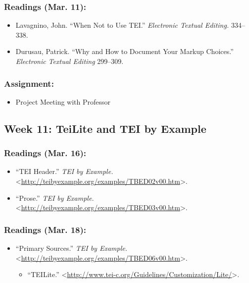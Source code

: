 \documentclass[]{article}
\begin{document}
\subsubsection{Readings (Mar. 11):}\label{readings-mar.-11}

\begin{itemize}
\itemsep1pt\parskip0pt
\item
  Lavagnino, John. ``When Not to Use TEI.'' \emph{Electronic Textual
  Editing.} 334--338.
\item
  Durusau, Patrick. ``Why and How to Document Your Markup Choices.''
  \emph{Electronic Textual Editing} 299--309.
\end{itemize}

\subsubsection{Assignment:}\label{assignment-1}

\begin{itemize}
\itemsep1pt\parskip0pt
\item
  Project Meeting with Professor
\end{itemize}

\subsection{Week 11: TeiLite and TEI by
Example}\label{week-11-teilite-and-tei-by-example}

\subsubsection{Readings (Mar. 16):}\label{readings-mar.-16}

\begin{itemize}
\itemsep1pt\parskip0pt
\item
  ``TEI Header.'' \emph{TEI by Example.}
  \textless{}\url{http://teibyexample.org/examples/TBED02v00.htm}\textgreater{}.
\item
  ``Prose.'' \emph{TEI by Example.}
  \textless{}\url{http://teibyexample.org/examples/TBED03v00.htm}\textgreater{}.
\end{itemize}

\subsubsection{Readings (Mar. 18):}\label{readings-mar.-18}

\begin{itemize}
\itemsep1pt\parskip0pt
\item
  ``Primary Sources.'' \emph{TEI by Example.}
  \textless{}\url{http://teibyexample.org/examples/TBED06v00.htm}\textgreater{}.

  \begin{itemize}
  \itemsep1pt\parskip0pt
  \item
    ``TEILite.''
    \textless{}\url{http://www.tei-c.org/Guidelines/Customization/Lite/}\textgreater{}.
  \end{itemize}
\end{itemize}
\end{document}
